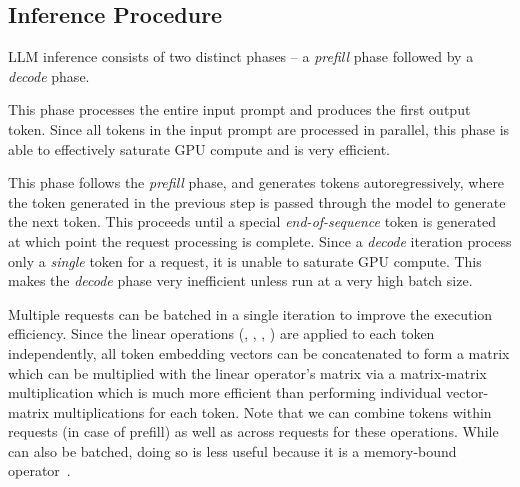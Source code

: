 \subsection{Inference Procedure}
\label{sec:background:prefill:decode}
LLM inference consists of two distinct phases -- a \textit{prefill} phase followed by a \textit{decode} phase.

 This phase processes the entire input prompt and produces the first output token. Since all tokens in the input prompt are processed in parallel, this phase is able to effectively saturate GPU compute and is very efficient. %


 This phase follows the \textit{prefill} phase, and generates tokens autoregressively, where the token generated in the previous step is passed through the model to generate the next token. This proceeds until a special \textit{end-of-sequence} token is generated at which point the request processing is complete. Since a \textit{decode} iteration process only a \textit{single} token for a request, it is unable to saturate GPU compute. This makes the \textit{decode} phase very inefficient unless run at a very high batch size.




Multiple requests can be batched in a single iteration to improve the execution efficiency. Since the linear operations (\attnpreproj, \attnpostproj, \ffnlnfirst, \ffnlnsecond) are applied to each token independently, all token embedding vectors can be concatenated to form a matrix which can be multiplied with the linear operator's matrix via a matrix-matrix multiplication which is much more efficient than performing individual vector-matrix multiplications for each token. Note that we can combine tokens within requests (in case of prefill) as well as across requests for these operations. While \attn can also be batched, doing so is less useful because it is a memory-bound operator~\cite{orca,flashattention}. 


